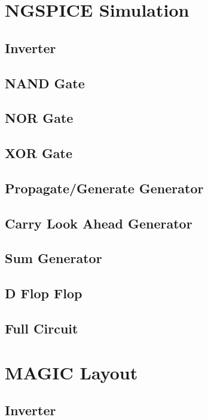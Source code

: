 \documentclass[conference]{IEEEtran}
\begin{document}
\section{NGSPICE Simulation}

\subsection{Inverter}

\subsection{NAND Gate}

\subsection{NOR Gate}

\subsection{XOR Gate}

\subsection{Propagate/Generate Generator}

\subsection{Carry Look Ahead Generator}

\subsection{Sum Generator}

\subsection{D Flop Flop}

\subsection{Full Circuit}

\section{MAGIC Layout}

\subsection{Inverter}
\end{document}
